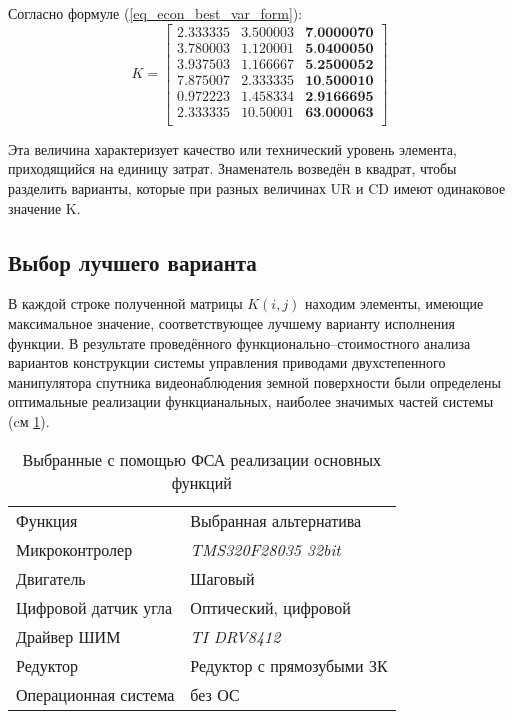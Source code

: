 Согласно формуле (\ref{eq_econ_best_var_form}):
\begin{equation}
    K =
        \begin{bmatrix}
            2.333335 & 3.500003 & \textbf{7.0000070} \\
            3.780003 & 1.120001 & \textbf{5.0400050} \\
            3.937503 & 1.166667 & \textbf{5.2500052} \\
            7.875007 & 2.333335 & \textbf{10.500010} \\
            0.972223 & 1.458334 & \textbf{2.9166695} \\
            2.333335 & 10.50001 & \textbf{63.000063} \\
        \end{bmatrix}
    \label{eq_econ_best_var}
\end{equation}

Эта величина характеризует качество или технический уровень
элемента, приходящийся на единицу затрат. Знаменатель возведён в квадрат,
чтобы разделить варианты, которые при разных величинах UR и CD имеют
одинаковое значение K.

\subsection{Выбор лучшего варианта}
В каждой строке полученной матрицы $K(i, j)$ находим элементы,
имеющие максимальное значение, соответствующее лучшему варианту
исполнения функции.
В результате проведённого функционально--стоимостного анализа
вариантов конструкции системы управления приводами двухстепенного манипулятора
спутника видеонаблюдения земной поверхности были определены оптимальные
реализации функцианальных, наиболее значимых частей системы
(cм \ref{tbl_econ_result}).

\begin{table}[H]
    \centering
    \begin{tabular}{|l|l|}
        \hline
        Функция & Выбранная альтернатива \\
        Микроконтролер & \textit{TMS320F28035 32bit} \\
        \hline
        Двигатель & Шаговый \\
        \hline
        Цифровой датчик угла & Оптический, цифровой \\
        \hline
        Драйвер ШИМ & \textit{TI DRV8412} \\
        \hline
        Редуктор & Редуктор с прямозубыми ЗК \\
        \hline
        Операционная система & без ОС \\
        \hline
    \end{tabular}
    \caption{Выбранные с помощью ФСА реализации основных функций}
    \label{tbl_econ_result}
\end{table}

